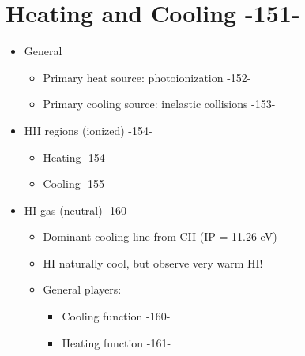\documentclass[12pt]{article}
\begin{document}
\section{Heating and Cooling -151-}
    \begin{itemize}
      \item General
      \begin{itemize}
        \item Primary heat source: photoionization -152-
        \item Primary cooling source: inelastic collisions -153-
      \end{itemize}
      \item HII regions (ionized) -154-
      \begin{itemize}
        \item Heating -154-
        \item Cooling -155-
      \end{itemize}
      \item HI gas (neutral) -160-
      \begin{itemize}
        \item Dominant cooling line from CII (IP = 11.26 eV)
        \item HI naturally cool, but observe very warm HI!
        \item General players:
        \begin{itemize}
          \item Cooling function -160-
          \item Heating function -161-
        \end{itemize}
      \end{itemize}
    \end{itemize}
\end{document}
